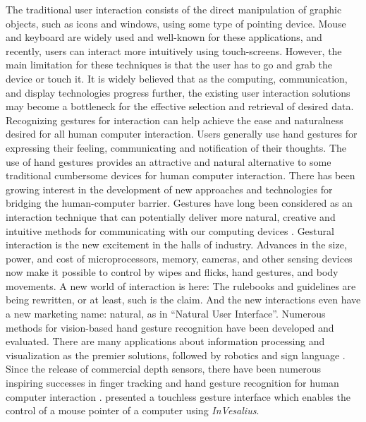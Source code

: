 The traditional user interaction consists of the direct manipulation of graphic objects, such as icons and windows, using some type of pointing device. Mouse and keyboard are widely used and well-known for these applications, and recently, users can interact more intuitively using touch-screens. However, the main limitation for these techniques is that the user has to go and grab the device or touch it.  
It is widely believed that as the computing, communication, and display technologies progress further, the existing user interaction solutions may become a bottleneck for the effective selection and retrieval of desired data. %
Recognizing gestures for interaction can help achieve the ease and naturalness desired for all human computer interaction. Users generally use hand gestures for expressing their feeling, communicating and notification of their thoughts. The use of hand gestures provides an attractive and natural alternative to some traditional cumbersome devices for human computer interaction. 
There has been growing interest in the development of new approaches and technologies for bridging the human-computer barrier. Gestures have long been considered as an interaction technique that can potentially deliver more natural, creative and intuitive methods for communicating with our computing devices \cite{Rautaray2015}. 
Gestural interaction is the new excitement in the halls of industry. Advances in the size, power, and cost of microprocessors, memory, cameras, and other sensing devices now make it possible to control by wipes and flicks, hand gestures, and body movements. A new world of interaction is here: The rulebooks and guidelines are being rewritten, or at least, such is the claim. And the new interactions even have a new marketing name: natural, as in ``Natural User Interface''.
Numerous methods for vision-based hand gesture recognition have been developed and evaluated. There are many applications about information processing \cite{Moyle2002,Lenman2002} and visualization as the premier solutions, followed by robotics and sign language \cite{Swindells2002,Osawa2000}. 
Since the release of commercial depth sensors, there have been numerous inspiring successes in finger tracking and hand gesture recognition for human computer interaction \cite{ZhouRen2011,Kulshreshth2013}. \citet{Ruppert2012a} presented a touchless gesture interface which enables the control of a mouse pointer of a computer using \textit{InVesalius}. 

